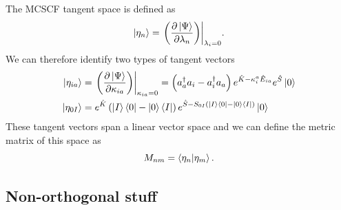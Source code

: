 \documentclass[11pt,a4paper]{article}
\newcommand{\hE}{\Hat{E}} %
\newcommand{\hK}{\Hat{K}} %
\newcommand{\hS}{\Hat{S}}
\newcommand{\cre}[1]{a_{#1}^\dagger} %
\newcommand{\ani}[1]{a_{#1}} %
\begin{document}
The MCSCF tangent space is defined as
\begin{equation}
  \label{eq:MCSCF_TangentVectors}
  \ket{\eta_n}=\evalat*{\mleft(\pdv{\ket{\Psi}}{\lambda_n}\mright)}{\lambda_i=0}.
\end{equation}
We can therefore identify two types of tangent vectors
\begin{align}
  \ket{\eta_{ia}}&=\evalat*{\mleft(\pdv{\ket{\Psi}}{\kappa_{ia}}\mright)}{\kappa_{ia}=0}=\left(\cre{a}\ani{i}-\cre{i}\ani{a}\right)e^{\hK-\kappa_i^a \hE_{ia}}e^{\hS}\ket{0} \\
  \ket{\eta_{0I}}&= e^{\hK}\left(\ket{I}\bra{0}-\ket{0}\bra{I}\right)e^{\hS-S_{0I}(\ket{I}\bra{0}-\ket{0}\bra{I})}\ket{0}
\end{align}
These tangent vectors span a linear vector space and we can define the metric matrix of this space as
\begin{equation}
  \label{eq:MCSCF_TangentMetric}
  M_{nm}=\braket{\eta_n}{\eta_m}.
\end{equation}

\subsection{Non-orthogonal stuff}
\end{document}
